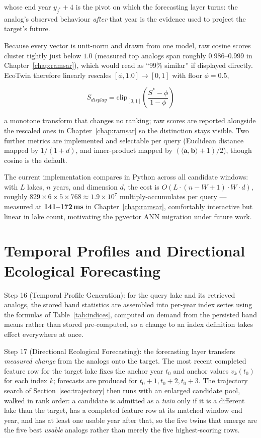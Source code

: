 \documentclass[12pt,a4paper,oneside]{report}
\begin{document}
whose end year $y_{j^{*}}+4$ is the pivot on which the forecasting
layer turns: the analog's observed behaviour \emph{after} that year
is the evidence used to project the target's future.

Because every vector is unit-norm and drawn from one model, raw
cosine scores cluster tightly just below $1.0$ (measured top analogs
span roughly 0.986--0.999 in Chapter~\ref{chap:ramsar}), which would
read as ``99\% similar'' if displayed directly. EcoTwin therefore
linearly rescales $[\phi, 1.0] \to [0,1]$ with floor $\phi=0.5$,

\begin{equation}
S_{display} = \mathrm{clip}_{[0,1]}\!\left(\frac{S^{*}-\phi}{1-\phi}\right)
\end{equation}

a monotone transform that changes no ranking; raw scores are
reported alongside the rescaled ones in Chapter~\ref{chap:ramsar} so
the distinction stays visible. Two further metrics are implemented
and selectable per query (Euclidean distance mapped by $1/(1+d)$,
and inner-product mapped by $(\langle
\mathbf{a},\mathbf{b}\rangle+1)/2$), though cosine is the default.

The current implementation compares in Python across all candidate
windows: with $L$ lakes, $n$ years, and dimension $d$, the cost is
$O(L\cdot(n{-}W{+}1)\cdot W\cdot d)$, roughly $829\times6\times5\times768
\approx 1.9\times10^7$ multiply-accumulates per query --- measured
at \textbf{141--172\,ms} in Chapter~\ref{chap:ramsar}, comfortably
interactive but linear in lake count, motivating the pgvector ANN
migration under future work.

\section{Temporal Profiles and Directional Ecological Forecasting}
\label{sec:forecast_method}

Step 16 (Temporal Profile Generation): for the query lake and its
retrieved analogs, the stored band statistics are assembled into
per-year index series using the formulas of Table~\ref{tab:indices},
computed on demand from the persisted band means rather than stored
pre-computed, so a change to an index definition takes effect
everywhere at once.

Step 17 (Directional Ecological Forecasting): the forecasting layer
transfers \emph{measured change} from the
analogs onto the target. The most recent completed feature row for
the target lake fixes the anchor year $t_0$ and anchor values
$v_k(t_0)$ for each index $k$; forecasts are produced for
$t_0+1,t_0+2,t_0+3$. The trajectory search of
Section~\ref{sec:trajectory} then runs with an enlarged candidate
pool, walked in rank order: a candidate is admitted as a
\emph{twin} only if it is a different lake than the target, has a
completed feature row at its matched window end year, and has at
least one usable year after that, so the five twins that emerge are
the five best \emph{usable} analogs rather than merely the five
highest-scoring rows.
\end{document}
